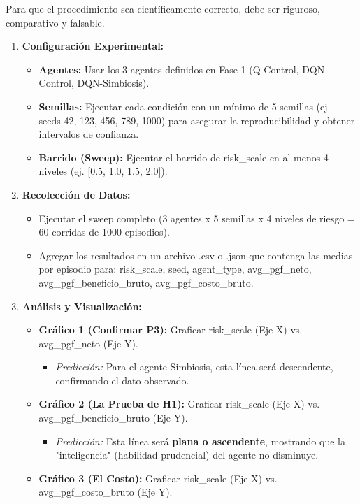 Para que el procedimiento sea científicamente correcto, debe ser
riguroso, comparativo y falsable.

\begin{enumerate}
\def\labelenumi{\arabic{enumi}.}
\item
  \textbf{Configuración Experimental:}

  \begin{itemize}
  \item
    \textbf{Agentes:} Usar los 3 agentes definidos en Fase 1 (Q-Control,
    DQN-Control, DQN-Simbiosis).
  \item
    \textbf{Semillas:} Ejecutar cada condición con un mínimo de 5
    semillas (ej. -\/-seeds 42, 123, 456, 789, 1000) para asegurar la
    reproducibilidad y obtener intervalos de confianza.
  \item
    \textbf{Barrido (Sweep):} Ejecutar el barrido de risk\_scale en al
    menos 4 niveles (ej. {[}0.5, 1.0, 1.5, 2.0{]}).
  \end{itemize}
\item
  \textbf{Recolección de Datos:}

  \begin{itemize}
  \item
    Ejecutar el sweep completo (3 agentes x 5 semillas x 4 niveles de
    riesgo = 60 corridas de 1000 episodios).
  \item
    Agregar los resultados en un archivo .csv o .json que contenga las
    medias por episodio para: risk\_scale, seed, agent\_type,
    avg\_pgf\_neto, avg\_pgf\_beneficio\_bruto, avg\_pgf\_costo\_bruto.
  \end{itemize}
\item
  \textbf{Análisis y Visualización:}

  \begin{itemize}
  \item
    \textbf{Gráfico 1 (Confirmar P3):} Graficar risk\_scale (Eje X) vs.
    avg\_pgf\_neto (Eje Y).

    \begin{itemize}
    \item
      \emph{Predicción:} Para el agente Simbiosis, esta línea será
      descendente, confirmando el dato observado.
    \end{itemize}
  \item
    \textbf{Gráfico 2 (La Prueba de H1):} Graficar risk\_scale (Eje X)
    vs. avg\_pgf\_beneficio\_bruto (Eje Y).

    \begin{itemize}
    \item
      \emph{Predicción:} Esta línea será \textbf{plana o ascendente},
      mostrando que la "inteligencia" (habilidad prudencial) del agente
      no disminuye.
    \end{itemize}
  \item
    \textbf{Gráfico 3 (El Costo):} Graficar risk\_scale (Eje X) vs.
    avg\_pgf\_costo\_bruto (Eje Y).


\end{itemize}
\end{enumerate}

